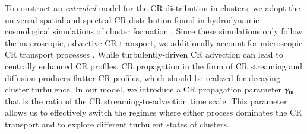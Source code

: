 \documentclass[useAMS,usenatbib]{mn2e}
\begin{document}
To construct an \emph{extended} model for the CR distribution in clusters, we
adopt the universal spatial and spectral CR distribution found in hydrodynamic
cosmological simulations of cluster formation \citep{2010MNRAS.409..449P}. Since
these simulations only follow the macroscopic, advective CR transport, we
additionally account for microscopic CR transport processes
\citep{2011A&A...527A..99E}. While turbulently-driven CR advection can lead to
centrally enhanced CR profiles, CR propagation in the form of CR streaming and
diffusion produces flatter CR profiles, which should be realized for decaying
cluster turbulence. In our model, we introduce a CR propagation parameter
$\gamma_{{\mathrm{tu}}}$ that is the ratio of the CR streaming-to-advection time
scale. This parameter allows us to effectively switch the regimes where either
process dominates the CR transport and to explore different turbulent states of
clusters.
\end{document}
